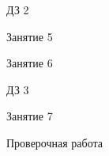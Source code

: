 \begin{homework}[number=2]
	\begin{listofex}
		\item ДЗ 2
	\end{listofex}
\end{homework}

\begin{class}[number=5]
	\begin{listofex}
		\item Занятие 5
	\end{listofex}
\end{class}

\begin{class}[number=6]
	\begin{listofex}
		\item Занятие 6
	\end{listofex}
\end{class}

\begin{homework}[number=3]
	\begin{listofex}
		\item ДЗ 3
	\end{listofex}
\end{homework}

\begin{class}[number=7]
	\begin{listofex}
		\item Занятие 7
	\end{listofex}
\end{class}

\begin{exam}
	\begin{listofex}
		\item Проверочная работа
	\end{listofex}
\end{exam}
